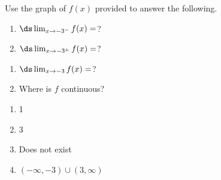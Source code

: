 {Use the graph of $f(x)$ provided to answer the following.

\noindent\begin{minipage}[t]{.5\linewidth}
\begin{enumerate}
\item		$\ds \lim_{x\to-3^-} f(x) = $?
\item		$\ds \lim_{x\to-3^+} f(x) = $?
\end{enumerate}
\end{minipage}
\begin{minipage}[t]{.5\linewidth}
\begin{enumerate}\addtocounter{enumii}{2}
\item		$\ds \lim_{x\to-3} f(x) = $?
\item		Where is $f$ continuous?
\end{enumerate}
\end{minipage}

}
{\begin{enumerate}
\item		1
\item		3
\item		Does not exist
\item		$(-\infty,-3)\cup (3,\infty)$
\end{enumerate}
}
